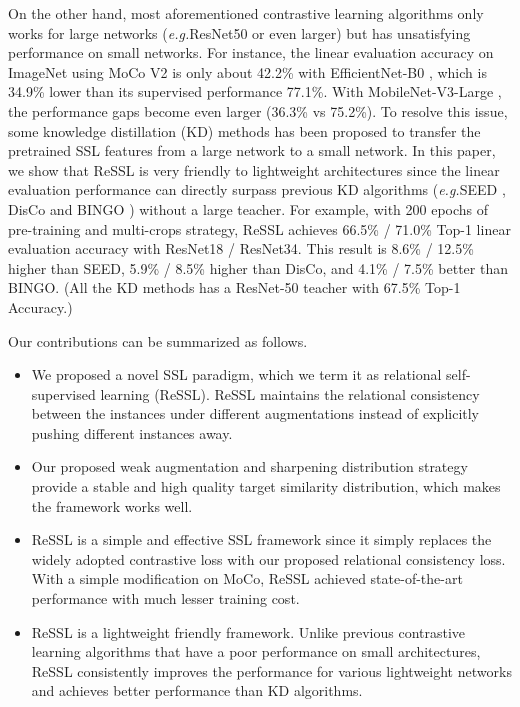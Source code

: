 \documentclass{article}
\newcommand{\<}{\left\langle}
\renewcommand{\>}{\right\rangle}
\newcommand{\eg}{{\emph{e.g.}}}
\begin{document}
On the other hand, most aforementioned contrastive learning algorithms \cite{mocov2, simclr} only works for large networks (\eg ResNet50 \cite{resnet} or even larger) but has unsatisfying performance on small networks. For instance, the linear evaluation accuracy on ImageNet using MoCo V2 is only about 42.2\% with EfficientNet-B0 \cite{efficientnet}, which is 34.9\% lower than its supervised performance 77.1\%. With MobileNet-V3-Large \cite{mbv3}, the performance gaps become even larger (36.3\% vs 75.2\%). To resolve this issue, some knowledge distillation (KD) methods has been proposed to transfer the pretrained SSL features from a large network to a small network. In this paper, we show that ReSSL is very friendly to lightweight architectures since the linear evaluation performance can directly surpass previous KD algorithms (\eg SEED \cite{seed}, DisCo \cite{disco} and BINGO \cite{bingo}) without a large teacher. For example, with 200 epochs of pre-training and multi-crops strategy, ReSSL achieves 66.5\% / 71.0\% Top-1 linear evaluation accuracy with ResNet18 / ResNet34. This result is 8.6\% / 12.5\% higher than SEED, 5.9\% / 8.5\% higher than DisCo, and 4.1\% / 7.5\% better than BINGO. (All the KD methods has a ResNet-50 teacher with 67.5\% Top-1 Accuracy.)



Our contributions can be summarized as follows.
\begin{itemize}
    \item We proposed a novel SSL paradigm, which we term it as relational self-supervised learning (ReSSL). ReSSL maintains the relational consistency between the instances under different augmentations instead of explicitly pushing different instances away.
    
    \item  Our proposed weak augmentation and sharpening distribution strategy provide a stable and high quality target similarity distribution, which makes the framework works well.
    
    \item  ReSSL is a simple and effective SSL framework since it simply replaces the widely adopted contrastive loss with our proposed relational consistency loss. With a simple modification on MoCo, ReSSL achieved state-of-the-art performance with much lesser training cost. 
    
    \item ReSSL is a lightweight friendly framework. Unlike previous contrastive learning algorithms that have a poor performance on small architectures, ReSSL consistently improves the performance  for various lightweight networks and achieves better performance than KD algorithms.
    
    
\end{itemize}
\end{document}

